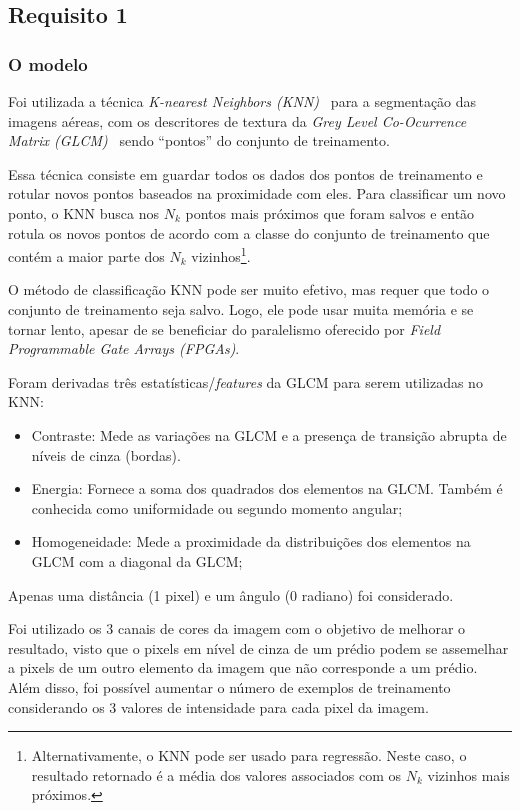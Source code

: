 \documentclass{bmvc2k}
\begin{document}
\subsection{Requisito 1}
\subsubsection{O modelo}
Foi utilizada a técnica \textit{K-nearest Neighbors (KNN)~\cite{knn}} para a segmentação das imagens aéreas, com os descritores de textura da \textit{Grey Level Co-Ocurrence Matrix (GLCM)}~\cite{haralick} sendo ``pontos'' do conjunto de treinamento.

Essa técnica consiste em guardar todos os dados dos pontos de treinamento e rotular novos pontos baseados na proximidade com eles. Para classificar um novo ponto, o KNN busca nos $N_k$ pontos mais próximos que foram salvos e então rotula os novos pontos de acordo com a classe do conjunto de treinamento que contém a maior parte dos $N_k$ vizinhos\footnote{Alternativamente, o KNN pode ser usado para regressão. Neste caso, o resultado retornado é a média dos valores associados com os $N_k$ vizinhos mais próximos.}.

O método de classificação KNN pode ser muito efetivo, mas requer que todo o conjunto de treinamento seja salvo. Logo, ele pode usar muita memória e se tornar lento, apesar de se beneficiar do paralelismo oferecido por \textit{Field Programmable Gate Arrays (FPGAs)}.

Foram derivadas três estatísticas/\textit{features} da GLCM para serem utilizadas no KNN:
\begin{itemize}
\item Contraste: Mede as variações na GLCM e a presença de transição abrupta de níveis de cinza (bordas).
\item Energia: Fornece a soma dos quadrados dos elementos na GLCM. Também é conhecida como uniformidade ou segundo momento angular;
\item Homogeneidade: Mede a proximidade da distribuições dos elementos na GLCM com a diagonal da GLCM;
\end{itemize}
Apenas uma distância (1 pixel) e um ângulo (0 radiano) foi considerado.

Foi utilizado os 3 canais de cores da imagem com o objetivo de melhorar o resultado, visto que o pixels em nível de cinza de um prédio podem se assemelhar a pixels de um outro elemento da imagem que não corresponde a um prédio. Além disso, foi possível aumentar o número de exemplos de treinamento considerando os 3 valores de intensidade para cada pixel da imagem.
\end{document}
